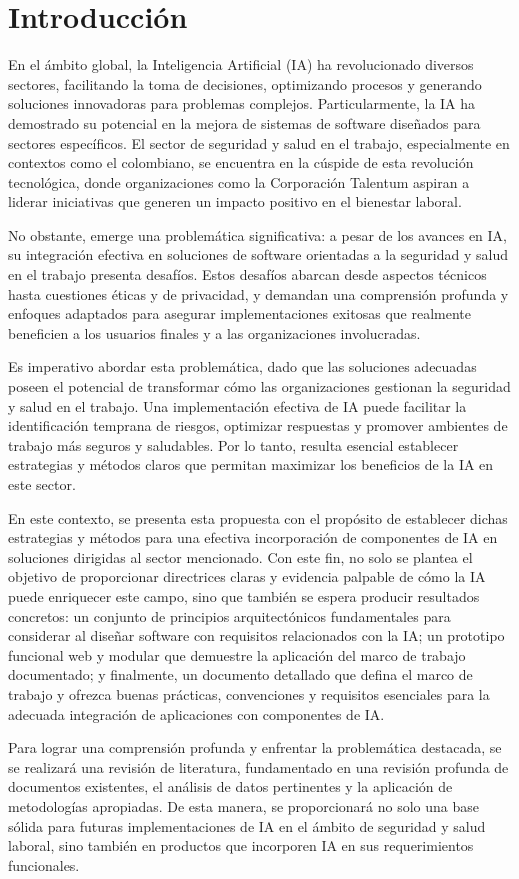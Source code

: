 \section{Introducción}

En el ámbito global, la Inteligencia Artificial (IA) ha revolucionado diversos sectores, facilitando la toma de decisiones, optimizando procesos y generando soluciones innovadoras para problemas complejos. Particularmente, la IA ha demostrado su potencial en la mejora de sistemas de software diseñados para sectores específicos. El sector de seguridad y salud en el trabajo, especialmente en contextos como el colombiano, se encuentra en la cúspide de esta revolución tecnológica, donde organizaciones como la Corporación Talentum aspiran a liderar iniciativas que generen un impacto positivo en el bienestar laboral.

No obstante, emerge una problemática significativa: a pesar de los avances en IA, su integración efectiva en soluciones de software orientadas a la seguridad y salud en el trabajo presenta desafíos. Estos desafíos abarcan desde aspectos técnicos hasta cuestiones éticas y de privacidad, y demandan una comprensión profunda y enfoques adaptados para asegurar implementaciones exitosas que realmente beneficien a los usuarios finales y a las organizaciones involucradas.

Es imperativo abordar esta problemática, dado que las soluciones adecuadas poseen el potencial de transformar cómo las organizaciones gestionan la seguridad y salud en el trabajo. Una implementación efectiva de IA puede facilitar la identificación temprana de riesgos, optimizar respuestas y promover ambientes de trabajo más seguros y saludables. Por lo tanto, resulta esencial establecer estrategias y métodos claros que permitan maximizar los beneficios de la IA en este sector.

En este contexto, se presenta esta propuesta con el propósito de establecer dichas estrategias y métodos para una efectiva incorporación de componentes de IA en soluciones dirigidas al sector mencionado. Con este fin, no solo se plantea el objetivo de proporcionar directrices claras y evidencia palpable de cómo la IA puede enriquecer este campo, sino que también se espera producir resultados concretos: un conjunto de principios arquitectónicos fundamentales para considerar al diseñar software con requisitos relacionados con la IA; un prototipo funcional web y modular que demuestre la aplicación del marco de trabajo documentado; y finalmente, un documento detallado que defina el marco de trabajo y ofrezca buenas prácticas, convenciones y requisitos esenciales para la adecuada integración de aplicaciones con componentes de IA.

Para lograr una comprensión profunda y enfrentar la problemática destacada, se se realizará una revisión de literatura, fundamentado en una revisión profunda de documentos existentes, el análisis de datos pertinentes y la aplicación de metodologías apropiadas. De esta manera, se proporcionará no solo una base sólida para futuras implementaciones de IA en el ámbito de seguridad y salud laboral, sino también en productos que incorporen IA en sus requerimientos funcionales.
